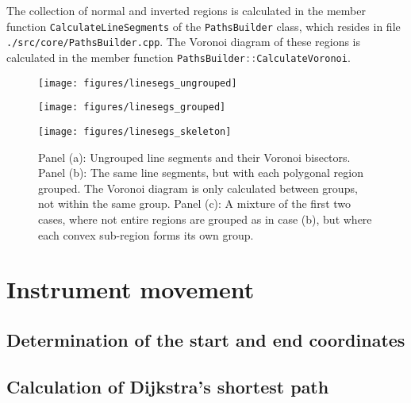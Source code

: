 The collection of normal and inverted regions is calculated in the member function
\lstinline[language=C++]|CalculateLineSegments| of the \lstinline[language=C++]|PathsBuilder|
class, which resides in file \lstinline|./src/core/PathsBuilder.cpp|. 
The Voronoi diagram of these regions is calculated in the member function
\lstinline[language=C++]|PathsBuilder::CalculateVoronoi|.


\label{sec:voronoi}
\begin{figure*}
	\begin{minipage}{0.5 \textwidth}
		\begin{center}
			\texttt{[image: figures/linesegs\_ungrouped]}
		\end{center}
	\end{minipage}
	\begin{minipage}{0.5 \textwidth}
		\begin{center}
			\texttt{[image: figures/linesegs\_grouped]}
		\end{center}
	\end{minipage}
	\begin{minipage}{0.5 \textwidth}
		\begin{center}
			\texttt{[image: figures/linesegs\_skeleton]}
		\end{center}
	\end{minipage}
	\caption{Panel (a): Ungrouped line segments and their Voronoi bisectors.
		Panel (b): The same line segments, but with each polygonal region grouped.
		The Voronoi diagram is only calculated between groups, not within the same group.
		Panel (c): A mixture of the first two cases, where not entire regions are grouped
		as in case (b), but where each convex sub-region forms its own group.
		\label{fig:linesegs_grouped_voro}}
\end{figure*}








\section{Instrument movement}
\label{sec:exepath}


\subsection{Determination of the start and end coordinates}



\subsection{Calculation of Dijkstra's shortest path}
\label{sec:dijkstra}


